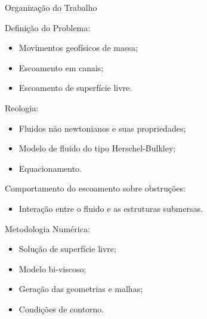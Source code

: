 \begin{frame}{Organização do Trabalho}
    \begin{minipage}[c]{0.49\textwidth}
        Definição do Problema:
            \begin{itemize}
                \item Movimentos geofísicos de massa;
                \item Escoamento em canais;
                \item Escoamento de superfície livre.
            \end{itemize}

        \hfill

        \pause
        Reologia:
        \begin{itemize}
            \item Fluidos não newtonianos e suas propriedades; 
            \item Modelo de fluido do tipo Herschel-Bulkley;
            \item Equacionamento.
        \end{itemize}
    \end{minipage}    
    \hfill
    \begin{minipage}[c]{0.49\textwidth}
        \pause
        Comportamento do escoamento sobre obstruções:
        \begin{itemize}
            \item Interação entre o fluido e as estruturas submersas.
        \end{itemize}
            
        \hfill

        \pause
        Metodologia Numérica:
        \begin{itemize}
            \item Solução de superfície livre;
            \item Modelo bi-viscoso;
            \item Geração das geometrias e malhas;
            \item Condições de contorno.
        \end{itemize}
    \end{minipage}
\end{frame}